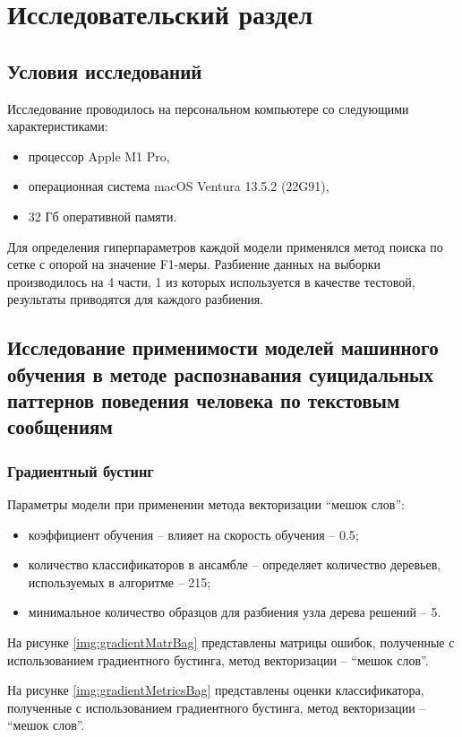 \section{Исследовательский раздел}
\subsection{Условия исследований}
Исследование проводилось на персональном компьютере со следующими характеристиками:

\begin{itemize}
\item процессор Apple M1 Pro,
\item операционная система macOS Ventura 13.5.2 (22G91),
\item 32 Гб оперативной памяти.
\end{itemize}

Для определения гиперпараметров каждой модели применялся метод поиска по сетке с опорой на значение F1-меры. Разбиение данных на выборки производилось на 4 части, 1 из которых используется в качестве тестовой, результаты приводятся для каждого разбиения.

\subsection{Исследование применимости моделей машинного обучения в методе распознавания суицидальных паттернов поведения человека по текстовым сообщениям}

\subsubsection{Градиентный бустинг}

Параметры модели при применении метода векторизации ``мешок слов'':
\begin{itemize}
	\item коэффициент обучения -- влияет на скорость обучения -- 0.5;
	\item количество классификаторов в ансамбле -- определяет количество деревьев, используемых в алгоритме -- 215;
	\item минимальное количество образцов для разбиения узла дерева решений -- 5.
\end{itemize}

На рисунке \ref{img:gradientMatrBag} представлены матрицы ошибок, полученные с использованием градиентного бустинга, метод векторизации -- ``мешок слов''.

На рисунке \ref{img:gradientMetricsBag} представлены оценки классификатора, полученные с использованием градиентного бустинга, метод векторизации -- ``мешок слов''.

